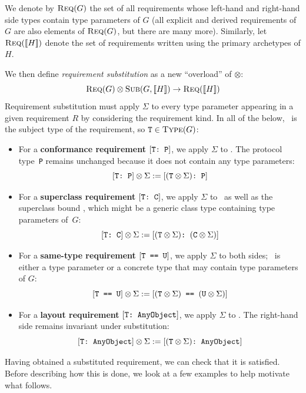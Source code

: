 \documentclass[../generics]{subfiles}
\begin{document}
\begin{definition}
We denote by $\textsc{Req}({G})$ the set of all requirements whose left-hand and right-hand side types contain type parameters of $G$ (all explicit and derived requirements of $G$ are also elements of $\textsc{Req}({G})$, but there are many more). Similarly, let $\textsc{Req}({[\![H]\!]})$ denote the set of requirements written using the primary archetypes of $H$.

We then define \emph{requirement substitution} as a new ``overload'' of \index{$\otimes$}$\otimes$:
\[\textsc{Req}({G})\otimes\textsc{Sub}({G, [\![H]\!]})\rightarrow\textsc{Req}({[\![H]\!]})\]
Requirement substitution must apply $\Sigma$ to every type parameter appearing in a given requirement $R$ by considering the requirement kind. In all of the below, \tT\ is the subject type of the requirement, so $\texttt{T}\in\textsc{Type}({G})$:
\begin{itemize}
\item For a \textbf{conformance requirement} $[\texttt{T:~P}]$, we apply $\Sigma$ to \tT. The protocol type~\texttt{P} remains unchanged because it does not contain any type parameters:
\[[\texttt{T:~P}]\otimes\Sigma:=[\texttt{$(\texttt{T}\otimes\Sigma)$:~P}]\]

\item For a \textbf{superclass requirement} $[\texttt{T:~C}]$, we apply $\Sigma$ to \tT\ as well as the superclass bound \tC, which might be a generic class type containing type parameters of~$G$:
\[[\texttt{T:~C}]\otimes\Sigma:=[\texttt{$(\texttt{T}\otimes\Sigma)$:~$(\texttt{C}\otimes\Sigma)$}]\]

\item For a \textbf{same-type requirement} $[\texttt{T == U}]$, we apply $\Sigma$ to both sides; \tU\ is either a type parameter or a concrete type that may contain type parameters of $G$:
\[[\texttt{T == U}]\otimes\Sigma:=[\texttt{$(\texttt{T}\otimes\Sigma)$ == $(\texttt{U}\otimes\Sigma)$}]\]

\item For a \textbf{layout requirement} $[\texttt{T:~AnyObject}]$, we apply $\Sigma$ to \tT. The right-hand side remains invariant under substitution:
\[[\texttt{T:~AnyObject}]\otimes\Sigma:=[\texttt{$(\texttt{T}\otimes\Sigma)$:~AnyObject}]\]
\end{itemize}
Having obtained a substituted requirement, we can check that it is satisfied. Before describing how this is done, we look at a few examples to help motivate what follows.
\end{definition}
\end{document}
